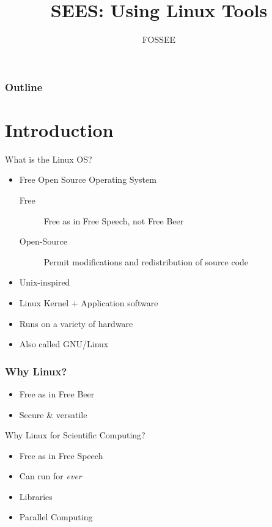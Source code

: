 \documentclass[12pt,compress]{beamer}
\title[Using Linux Tools]{SEES: Using Linux Tools}
\author[FOSSEE] {FOSSEE}
\institute[IIT Bombay] {Department of Aerospace Engineering\\IIT Bombay}
\date[]{}
\begin{document}
\begin{frame}
  \maketitle
\end{frame}

\begin{frame}
  \frametitle{Outline}
  \tableofcontents
\end{frame}


\section{Introduction}
\begin{frame}[fragile]
  \begin{block}{What is the Linux OS?}
    \begin{itemize}
    \item Free Open Source Operating System
      \begin{description}
        \item[Free] 
          Free as in Free Speech, not Free Beer
        \item[Open-Source]
          Permit modifications and redistribution of source code
      \end{description}
    \item Unix-inspired
    \item Linux Kernel + Application software
    \item Runs on a variety of hardware
    \item Also called GNU/Linux
    \end{itemize}
  \end{block}
\end{frame}

\begin{frame}[fragile]
  \frametitle{Why Linux?}
    \begin{itemize}
    \item Free as in Free Beer
    \item Secure \& versatile
    \end{itemize}

    \begin{block}{Why Linux for Scientific Computing?}
      \begin{itemize}
        \item Free as in Free Speech
        \item Can run for \emph{ever}
        \item Libraries
        \item Parallel Computing
      \end{itemize}
    \end{block}
\end{frame}
\end{document}

